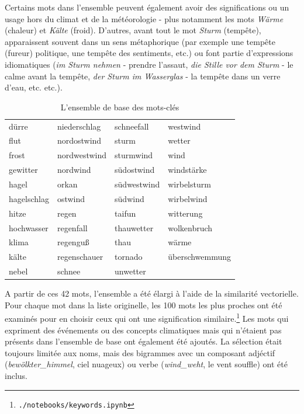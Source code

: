 \documentclass[a4paper,twoside,12pt]{article}
\begin{document}
\label{synonymes}Certains mots dans l'ensemble peuvent également avoir des significations ou un usage hors du climat et de la météorologie - plus notamment les mots \textit{Wärme} (chaleur) et \textit{Kälte} (froid). D'autres, avant tout le mot \textit{Sturm} (tempête), apparaissent souvent dans un sens métaphorique (par exemple une tempête (fureur) politique, une tempête des sentiments, etc.) ou font partie d'expressions idiomatiques (\textit{im Sturm nehmen} - prendre l’assaut, \textit{die Stille vor dem Sturm} - le calme avant la tempête, \textit{der Sturm im Wasserglas} - la tempête dans un verre d’eau, etc. etc.).

\begin{table}[h]
    \centering
    \small
\begin{tabular}{llll}
\toprule
      dürre & niederschlag &  schneefall &       westwind \\
       flut &  nordostwind &       sturm &         wetter \\
      frost & nordwestwind &   sturmwind &           wind \\
   gewitter &     nordwind &  südostwind &     windstärke \\
      hagel &        orkan & südwestwind &    wirbelsturm \\
hagelschlag &      ostwind &     südwind &     wirbelwind \\
      hitze &        regen &      taifun &      witterung \\
 hochwasser &    regenfall &   thauwetter &    wolkenbruch \\
      klima &     regenguß &        thau &          wärme \\
      kälte & regenschauer &     tornado & überschwemmung \\
      nebel &       schnee &    unwetter &            \\
\bottomrule
\end{tabular}
    \caption{L'ensemble de base des mots-clés}
    \label{tab:weather_events}
\end{table}

A partir de ces 42 mots, l'ensemble a été élargi à l'aide de la similarité vectorielle. Pour chaque mot dans la liste originelle, les 100 mots les plus proches ont été examinés pour en choisir ceux qui ont une signification similaire.\footnote{\texttt{./notebooks/keywords.ipynb}} Les mots qui expriment des événements ou des concepts climatiques mais qui n'étaient pas présents dans l'ensemble de base ont également été ajoutés. La sélection était toujours limitée aux noms, mais des bigrammes avec un composant adjéctif (\textit{bewölkter\_himmel}, ciel nuageux)  ou verbe (\textit{wind\_weht}, le vent souffle) ont été inclus.
\end{document}
